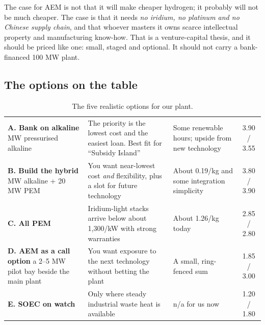 \begin{finding}
The case for AEM is not that it will make cheaper hydrogen; it probably will not be much cheaper. The case is that it needs \emph{no iridium, no platinum and no Chinese supply chain}, and that whoever masters it owns scarce intellectual property and manufacturing know-how. That is a venture-capital thesis, and it should be priced like one: small, staged and optional. It should not carry a bank-financed 100 MW plant. \confM
\end{finding}

\subsection{The options on the table}

\begin{table}[H]\centering\tablefont
\caption{The five realistic options for our plant.}
\begin{tabularx}{\textwidth}{@{}>{\RaggedRight\arraybackslash}p{31mm} L L c@{}}
\toprule
{} &  &  & \\ \midrule
\textbf{A. Bank on alkaline}  MW pressurised alkaline & The priority is the lowest cost and the easiest loan. Best fit for ``Subsidy Island'' & Some renewable hours; upside from new technology & 3.90 / 3.55\\
\textbf{B. Build the hybrid}  MW alkaline + 20 MW PEM & You want near-lowest cost \emph{and} flexibility, plus a slot for future technology & About \usd{}0.19/kg and some integration simplicity & 3.80 / 3.90\\
\textbf{C. All PEM} & Iridium-light stacks arrive below about \usd{}1,300/kW with strong warranties & About \usd{}1.26/kg today & 2.85 / 2.80\\
\textbf{D. AEM as a call option} \newline a 2–5 MW pilot bay beside the main plant & You want exposure to the next technology without betting the plant & A small, ring-fenced sum & 1.85 / 3.00\\
\textbf{E. SOEC on watch} & Only where steady industrial waste heat is available & n/a for us now & 1.20 / 1.80\\
\bottomrule
\end{tabularx}
\end{table}

